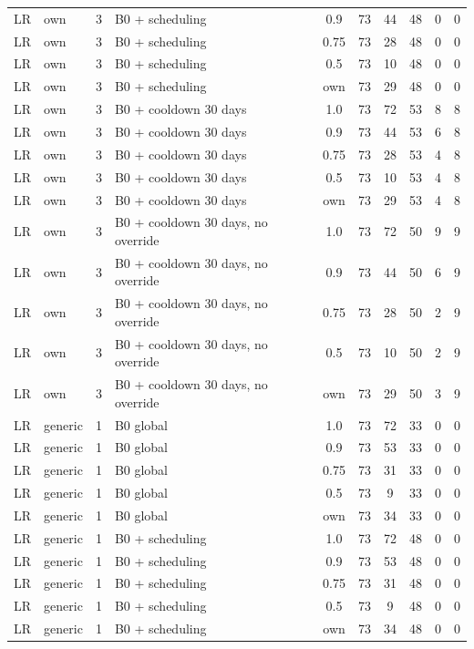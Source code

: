 \begin{longtable}{lllp{4.4cm}cccccc}
LR & own & 3 & B0 + scheduling & 0.9 & 73 & 44 & 48 & 0 & 0 \\
LR & own & 3 & B0 + scheduling & 0.75 & 73 & 28 & 48 & 0 & 0 \\
LR & own & 3 & B0 + scheduling & 0.5 & 73 & 10 & 48 & 0 & 0 \\
LR & own & 3 & B0 + scheduling & own & 73 & 29 & 48 & 0 & 0 \\
LR & own & 3 & B0 + cooldown 30 days & 1.0 & 73 & 72 & 53 & 8 & 8 \\
LR & own & 3 & B0 + cooldown 30 days & 0.9 & 73 & 44 & 53 & 6 & 8 \\
LR & own & 3 & B0 + cooldown 30 days & 0.75 & 73 & 28 & 53 & 4 & 8 \\
LR & own & 3 & B0 + cooldown 30 days & 0.5 & 73 & 10 & 53 & 4 & 8 \\
LR & own & 3 & B0 + cooldown 30 days & own & 73 & 29 & 53 & 4 & 8 \\
LR & own & 3 & B0 + cooldown 30 days, no override & 1.0 & 73 & 72 & 50 & 9 & 9 \\
LR & own & 3 & B0 + cooldown 30 days, no override & 0.9 & 73 & 44 & 50 & 6 & 9 \\
LR & own & 3 & B0 + cooldown 30 days, no override & 0.75 & 73 & 28 & 50 & 2 & 9 \\
LR & own & 3 & B0 + cooldown 30 days, no override & 0.5 & 73 & 10 & 50 & 2 & 9 \\
LR & own & 3 & B0 + cooldown 30 days, no override & own & 73 & 29 & 50 & 3 & 9 \\
LR & generic & 1 & B0 global & 1.0 & 73 & 72 & 33 & 0 & 0 \\
LR & generic & 1 & B0 global & 0.9 & 73 & 53 & 33 & 0 & 0 \\
LR & generic & 1 & B0 global & 0.75 & 73 & 31 & 33 & 0 & 0 \\
LR & generic & 1 & B0 global & 0.5 & 73 & 9 & 33 & 0 & 0 \\
LR & generic & 1 & B0 global & own & 73 & 34 & 33 & 0 & 0 \\
LR & generic & 1 & B0 + scheduling & 1.0 & 73 & 72 & 48 & 0 & 0 \\
LR & generic & 1 & B0 + scheduling & 0.9 & 73 & 53 & 48 & 0 & 0 \\
LR & generic & 1 & B0 + scheduling & 0.75 & 73 & 31 & 48 & 0 & 0 \\
LR & generic & 1 & B0 + scheduling & 0.5 & 73 & 9 & 48 & 0 & 0 \\
LR & generic & 1 & B0 + scheduling & own & 73 & 34 & 48 & 0 & 0 \\

\end{longtable}
